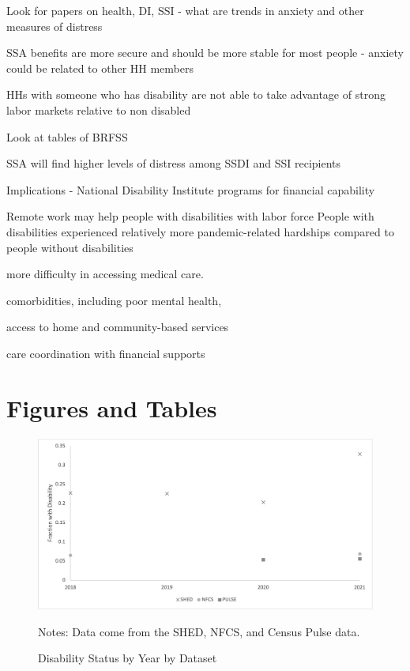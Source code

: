 \documentclass[12pt]{article}
\begin{document}
Look for papers on health, DI, SSI - what are trends in anxiety and other measures of distress

SSA benefits are more secure and should  be more stable for most people  - anxiety could be related to other HH members

HHs with someone who has disability are not able to take advantage of strong labor markets relative to non disabled

Look at tables of BRFSS

\cite{blanchflower2022covid}

SSA will find higher levels of distress among SSDI and SSI recipients 

Implications - National Disability Institute programs for financial capability


\cite{kruse2022disability}
Remote work may help people with disabilities with labor force
People with disabilities experienced relatively more pandemic-related hardships compared to people without disabilities

more difficulty in accessing medical care.

comorbidities, including poor mental health,

access to home and community-based services 

 care coordination  with financial supports
 
 \cite{mitra2022advancing}
 

\section{Figures and Tables}


 \begin{figure}[h!]\label{Disability}
\caption{Disability Status by Year by Dataset}
\centering
\includegraphics[scale=0.8]{Exhibits/Figure1.png}
\medskip 
\begin{minipage}{0.65\textwidth} 
{\footnotesize Notes: Data come from the SHED, NFCS, and Census Pulse data.  \par}
\end{minipage}
\end{figure}
 
\end{document}
